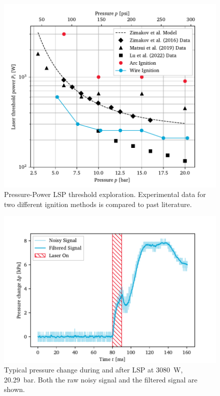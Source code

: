     \begin{figure}[h]
        \centering
        \includegraphics[]{assets/5 results/powerthreshold.pdf}
        \caption[Pressure-Power LSP threshold exploration]{Pressure-Power LSP threshold exploration. Experimental data for two different ignition methods is compared to past literature.}
        \label{fig:powerthreshold}
    \end{figure}

    \begin{figure}[h]
        \centering
        \includegraphics[]{assets/5 results/pressure_noise.pdf}
        \caption[Typical pressure change during and after LSP]{Typical pressure change during and after LSP at \qty{3080}{W}, \qty{20.29}{bar}. Both the raw noisy signal and the filtered signal are shown.}
        \label{fig:pressure_noise}
    \end{figure}

